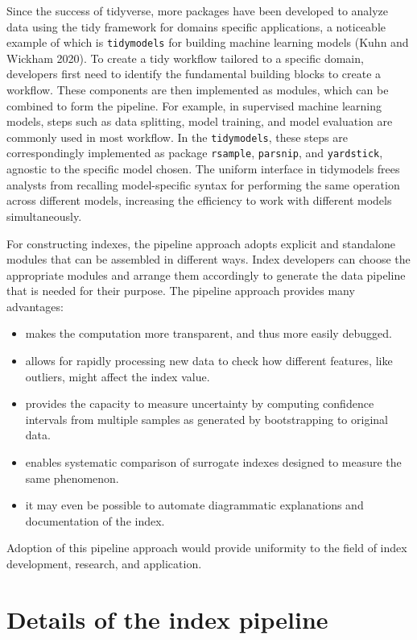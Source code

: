 \documentclass[
]{interact}
\providecommand{\tightlist}{%
  \setlength{\itemsep}{0pt}\setlength{\parskip}{0pt}}\usepackage{longtable,booktabs,array}
\begin{document}
Since the success of tidyverse, more packages have been developed to
analyze data using the tidy framework for domains specific applications,
a noticeable example of which is \texttt{tidymodels} for building
machine learning models (Kuhn and Wickham 2020). To create a tidy
workflow tailored to a specific domain, developers first need to
identify the fundamental building blocks to create a workflow. These
components are then implemented as modules, which can be combined to
form the pipeline. For example, in supervised machine learning models,
steps such as data splitting, model training, and model evaluation are
commonly used in most workflow. In the \texttt{tidymodels}, these steps
are correspondingly implemented as package \texttt{rsample},
\texttt{parsnip}, and \texttt{yardstick}, agnostic to the specific model
chosen. The uniform interface in tidymodels frees analysts from
recalling model-specific syntax for performing the same operation across
different models, increasing the efficiency to work with different
models simultaneously.

For constructing indexes, the pipeline approach adopts explicit and
standalone modules that can be assembled in different ways. Index
developers can choose the appropriate modules and arrange them
accordingly to generate the data pipeline that is needed for their
purpose. The pipeline approach provides many advantages:

\begin{itemize}
\tightlist
\item
  makes the computation more transparent, and thus more easily debugged.
\item
  allows for rapidly processing new data to check how different
  features, like outliers, might affect the index value.
\item
  provides the capacity to measure uncertainty by computing confidence
  intervals from multiple samples as generated by bootstrapping to
  original data.
\item
  enables systematic comparison of surrogate indexes designed to measure
  the same phenomenon.
\item
  it may even be possible to automate diagrammatic explanations and
  documentation of the index.
\end{itemize}

Adoption of this pipeline approach would provide uniformity to the field
of index development, research, and application.

\hypertarget{sec-pipeline}{%
\section{Details of the index pipeline}\label{sec-pipeline}}
\end{document}

